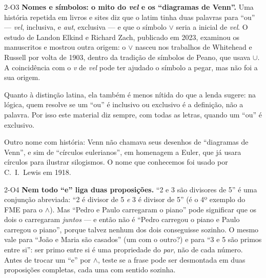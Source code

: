 \begin{obs}{2-O3}
\textbf{Nomes e símbolos: o mito do \emph{vel} e os \enquote{diagramas de Venn}.} Uma história repetida em livros e sites diz que o latim tinha duas palavras para \enquote{ou} — \emph{vel}, inclusiva, e \emph{aut}, exclusiva — e que o símbolo $\vee$ seria a inicial de \emph{vel}. O estudo de Landon Elkind e Richard Zach, publicado em 2023, examinou os manuscritos e mostrou outra origem: o $\vee$ nasceu nos trabalhos de Whitehead e Russell por volta de 1903, dentro da tradição de símbolos de Peano, que usava $\cup$. A coincidência com o \emph{v} de \emph{vel} pode ter ajudado o símbolo a pegar, mas não foi a sua origem.

Quanto à distinção latina, ela também é menos nítida do que a lenda sugere: na lógica, quem resolve se um \enquote{ou} é inclusivo ou exclusivo é a definição, não a palavra. Por isso este material diz sempre, com todas as letras, quando um \enquote{ou} é exclusivo.

Outro nome com história: Venn não chamava seus desenhos de \enquote{diagramas de Venn}, e sim de \enquote{círculos eulerianos}, em homenagem a Euler, que já usara círculos para ilustrar silogismos. O nome que conhecemos foi usado por C.~I.~Lewis em 1918.
\end{obs}

\begin{obs}{2-O4}
\textbf{Nem todo \enquote{e} liga duas proposições.} \enquote{2 e 3 são divisores de 5} é uma conjunção abreviada: \enquote{2 é divisor de 5 \emph{e} 3 é divisor de 5} (é o 4º exemplo do FME para o $\wedge$). Mas \enquote{Pedro e Paulo carregaram o piano} pode significar que os dois o carregaram \emph{juntos} — e então não é \enquote{Pedro carregou o piano e Paulo carregou o piano}, porque talvez nenhum dos dois conseguisse sozinho. O mesmo vale para \enquote{João e Maria são casados} (um com o outro?) e para \enquote{3 e 5 são primos entre si}: ser primo entre si é uma propriedade do \emph{par}, não de cada número. Antes de trocar um \enquote{e} por $\wedge$, teste se a frase pode ser desmontada em duas proposições completas, cada uma com sentido sozinha.
\end{obs}

